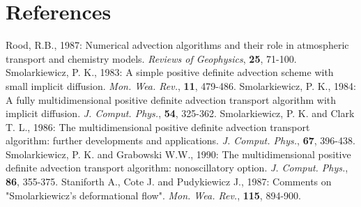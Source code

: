 \section{References}
\decrefname
Rood, R.B., 1987: Numerical advection algorithms and their role in
atmospheric transport and chemistry models.
{\it Reviews of Geophysics},  {\bf 25}, 71-100.
\decrefname
Smolarkiewicz, P. K., 1983: A simple positive definite advection scheme with
small implicit diffusion.
{\it Mon. Wea. Rev.},  {\bf 11}, 479-486.
\decrefname
Smolarkiewicz, P. K., 1984: A fully multidimensional positive definite advection
transport algorithm with implicit diffusion.
{\it J. Comput. Phys.},  {\bf 54}, 325-362.
\decrefname
Smolarkiewicz, P. K. and Clark T. L., 1986: The multidimensional positive definite
advection
transport algorithm: further developments and applications.
{\it J. Comput. Phys.},  {\bf 67}, 396-438.
\decrefname
Smolarkiewicz, P. K. and Grabowski W.W., 1990: The multidimensional
positive definite
advection
transport algorithm: nonoscillatory option.
{\it J. Comput. Phys.},  {\bf 86}, 355-375.
\decrefname
Staniforth A., Cote J. and Pudykiewicz J., 1987: Comments on "Smolarkiewicz's
deformational flow". {\it Mon. Wea. Rev.},  {\bf 115}, 894-900.
%
